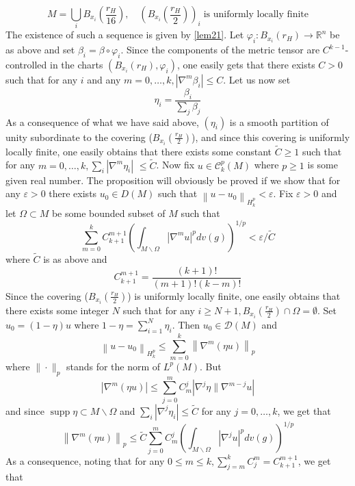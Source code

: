 \documentclass[12pt,hyperref,a4paper,UTF8]{ctexart}
\begin{document}
\begin{Proof}
$$M=\bigcup_i B_{x_i}\left(\frac{r_H}{16}\right), \quad\left(B_{x_i}\left(\frac{r_H}{2}\right)\right)_i \;\text{is uniformly locally finite}$$
The existence of such a sequence is given by \autoref{lem21}. Let $\varphi_i: B_{x_i}\left(r_H\right) \rightarrow \mathbb{R}^n$ be as above and set $\beta_i=\beta \circ \varphi_i$. Since the components of the metric tensor are
$C^{k-1}$-controlled in the charts $\left(B_{x_i}\left(r_H\right), \varphi_i\right)$, one easily gets that there exists $C>0$ such that for any $i$ and any $m=0, \ldots, k,\left|\nabla^m \beta_i\right| \leq C$. Let us now set
$$
\eta_i=\frac{\beta_i}{\sum_j \beta_j}
$$
As a consequence of what we have said above, $\left(\eta_i\right)$ is a smooth partition of unity subordinate to the covering ($B_{x_i}\left(\frac{r_H}{2}\right)$), and since this covering is uniformly locally finite, one easily obtains that there exists some constant $\tilde{C} \geq 1$ such that for any $m=0, \ldots, k, \sum_i\left|\nabla^m \eta_i\right|$ $\leq \tilde{C}$. Now fix $u \in \mathcal{C}_k^p(M)$ where $p \geq 1$ is some given real number. The proposition will obviously be proved if we show that for any $\varepsilon>0$ there exists $u_0 \in D(M)$ such that $\left\|u-u_0\right\|_{H_k^p}<\varepsilon$. Fix $\varepsilon>0$ and let $\Omega \subset M$ be some bounded subset of $M$ such that
$$
\sum_{m=0}^k C_{k+1}^{m+1}\left(\int_{M \backslash \Omega}\left|\nabla^m u\right|^p d v(g)\right)^{1 / p}<\varepsilon / \tilde{C}
$$
where $\tilde{C}$ is as above and
$$
C_{k+1}^{m+1}=\frac{(k+1)!}{(m+1)!(k-m)!}
$$
Since the covering ($B_{x_i}\left(\frac{r_H}{2}\right)$) is uniformly locally finite, one easily obtains that there exists some integer $N$ such that for any $i \geq N+1, B_{x_i}\left(\frac{r_H}{2}\right) \cap \Omega=\emptyset$. Set $u_0=(1-\eta) u$ where $1-\eta=\sum_{i=1}^N \eta_i$. Then $u_0 \in \mathcal{D}(M)$ and
$$
\left\|u-u_0\right\|_{H_k^p} \leq \sum_{m=0}^k\left\|\nabla^m(\eta u)\right\|_p
$$
where $\|\cdot\|_p$ stands for the norm of $L^p(M)$. But
$$
\left|\nabla^m(\eta u)\right| \leq \sum_{j=0}^m C_m^j\left|\nabla^j \eta \| \nabla^{m-j} u\right|
$$
and since $\operatorname{supp} \eta \subset M \backslash \Omega$ and $\sum_i\left|\nabla^j \eta_i\right| \leq \tilde{C}$ for any $j=0, \ldots, k$, we get that
$$
\left\|\nabla^m(\eta u)\right\|_p \leq \tilde{C} \sum_{j=0}^m C_m^j\left(\int_{M \backslash \Omega}\left|\nabla^j u\right|^p d v(g)\right)^{1 / p}
$$
As a consequence, noting that for any $0 \leq m \leq k, \sum_{j=m}^k C_j^m=C_{k+1}^{m+1}$, we get that
$$
\begin{aligned}

\end{aligned}$$
\end{Proof}
\end{document}
